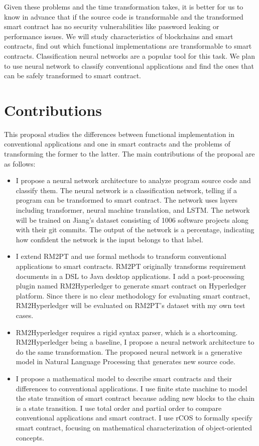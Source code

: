 Given these problems and the time transformation takes, it is better for us to know in advance that
if the source code is transformable and the transformed smart contract has no security vulnerabilities like password leaking or performance issues.
We will study characteristics of blockchains and smart contracts, find out which functional implementations are transformable to smart contracts.
Classification neural networks are a popular tool for this task.
We plan to use neural network to classify conventional applications and find the ones that can be safely transformed to smart contract.




\section{Contributions}
This proposal studies the differences between functional implementation in conventional applications and one in smart contracts
and the problems of transforming the former to the latter.
The main contributions of the proposal are as follows:

\begin{itemize}
\item  I propose a neural network architecture to analyze program source code and classify them. The neural network is a classification network, telling if a program can be transformed to smart contract.
The network uses layers including transformer, neural machine translation, and LSTM. The network will be trained on Jiang's dataset consisting of \num{1006} software projects along with their git commits.
The output of the network is a percentage, indicating how confident the network is the input belongs to that label.
\item I extend RM2PT and use formal methods to transform conventional applications to smart contracts. RM2PT originally transforms requirement documents in a DSL to Java desktop applications.
I add a post-processing plugin named RM2Hyperledger to generate smart contract on Hyperledger platform.
Since there is no clear methodology for evaluating smart contract, RM2\-Hyperledger will be evaluated on RM2PT's dataset with my own test cases.

\item RM2Hyperledger requires a rigid syntax parser, which is a shortcoming. RM2\-Hyperledger being a baseline, I propose a neural network architecture to do the same transformation.
The proposed neural network is a generative model in Natural Language Processing that generates new source code.
\item I propose a mathematical model to describe smart contracts and their differences to conventional applications.
I use finite state machine to model the state transition of smart contract because adding new blocks to the chain is a state transition.
I use total order and partial order to compare conventional applications and smart contract.
I use rCOS to formally specify smart contract, focusing on mathematical characterization of object-oriented concepts.

\end{itemize}

